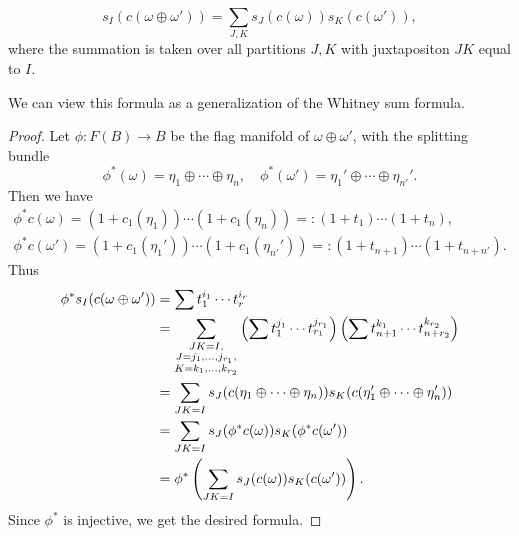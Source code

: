 \begin{lemma}[Thom]
    \begin{equation*}
        s_I(c(\omega\oplus\omega')) =
        \sum_{J,K} s_J(c(\omega)) s_K(c(\omega')),
    \end{equation*}
    where the summation is taken over all partitions $J,K$
    with juxtapositon $JK$ equal to $I$.
\end{lemma}
\begin{remark}
    We can view this formula as a generalization of the Whitney sum formula.
\end{remark}
\begin{proof}
    Let $\phi:F(B)\to B$ be the flag manifold of $\omega\oplus\omega'$,
    with the splitting bundle
    \begin{equation*}
        \phi^*(\omega) = \eta_1\oplus\cdots\oplus\eta_n, \quad
        \phi^*(\omega') = \eta_{1}'\oplus\cdots\oplus\eta_{n'}'.
    \end{equation*}
    Then we have
    \begin{gather*}
        \phi^*c(\omega) = 
        (1+c_1(\eta_1))\cdots(1+c_1(\eta_n)) =: 
        (1+t_1)\cdots(1+t_n), \\
        \phi^*c(\omega') = 
        (1+c_1(\eta_1'))\cdots(1+c_1(\eta_{n'}')) =: 
        (1+t_{n+1})\cdots(1+t_{n+n'}).
    \end{gather*}
    Thus
    \begin{align*}
        \phi^*s_I(c(\omega\oplus\omega')) 
        &= \sum t_1^{i_1}\cdots t_r^{i_r} \\
        &= \sum_{
        \begin{subarray}{c}
            JK = I, \\ J = j_1,\dots,j_{r_1}, \\ K = k_1,\dots,k_{r_2}
        \end{subarray}
        } 
        \left(\sum t_1^{j_1}\cdots t_{r_1}^{j_{r_1}}\right)
        \left(\sum t_{n+1}^{k_1}\cdots t_{n+r_2}^{k_{r_2}}\right) \\
        &= \sum_{JK=I} s_J(c(\eta_1\oplus\cdots\oplus\eta_n)) s_K(c(\eta_1'\oplus\cdots\oplus\eta_n')) \\
        &= \sum_{JK=I} s_J(\phi^*c(\omega)) s_K(\phi^*c(\omega')) \\
        &= \phi^*\left(\sum_{JK=I} s_J(c(\omega)) s_K(c(\omega'))\right).
    \end{align*}
    Since $\phi^*$ is injective, we get the desired formula.
\end{proof}

